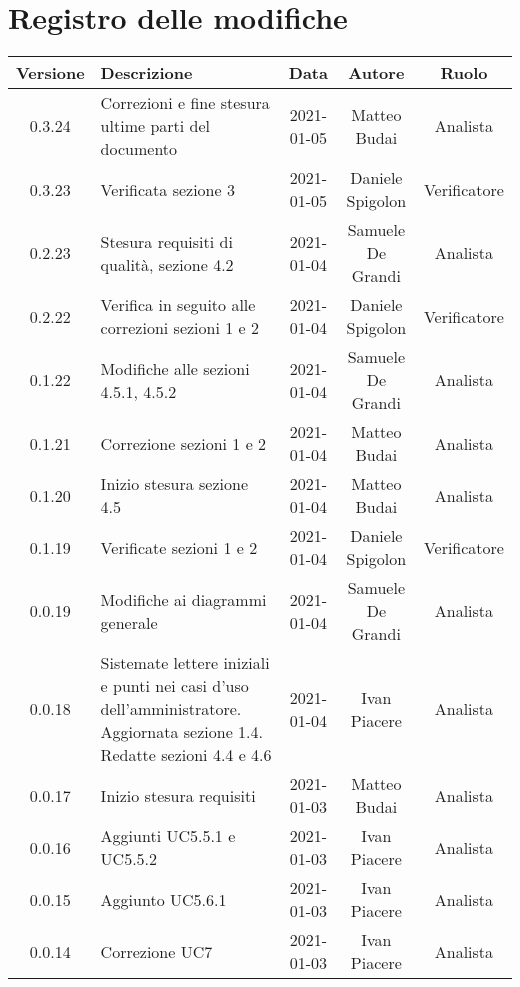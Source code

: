 \section*{Registro delle modifiche}

\begin{center}
	\begin{longtable}{|c|p{5cm}|c|c|c|}
		\hline
		\rowcolor{lighter-grayer}
		\textbf{Versione} & \textbf{Descrizione} & \textbf{Data} & \textbf{Autore} & \textbf{Ruolo} \\
		\hline
		\endfirsthead
		
		0.3.24 & Correzioni e fine stesura ultime parti del documento & 2021-01-05 & Matteo Budai & Analista \\
		\hline
		0.3.23 & Verificata sezione 3 & 2021-01-05 & Daniele Spigolon & Verificatore \\
		\hline
		0.2.23 & Stesura requisiti di qualità, sezione 4.2  & 2021-01-04 & Samuele De Grandi & Analista \\
		\hline
		0.2.22 & Verifica in seguito alle correzioni sezioni 1 e 2   & 2021-01-04 & Daniele Spigolon & Verificatore \\
		\hline
		0.1.22 & Modifiche alle sezioni 4.5.1, 4.5.2   & 2021-01-04 & Samuele De Grandi & Analista \\
		\hline
		0.1.21 & Correzione sezioni 1 e 2 & 2021-01-04 & Matteo Budai & Analista \\
		\hline
		0.1.20 & Inizio stesura sezione 4.5 & 2021-01-04 & Matteo Budai & Analista \\
		\hline
		0.1.19 & Verificate sezioni 1 e 2 & 2021-01-04 & Daniele Spigolon & Verificatore \\
		\hline
		0.0.19 & Modifiche ai diagrammi generale  & 2021-01-04 & Samuele De Grandi & Analista \\
		\hline
		0.0.18 & Sistemate lettere iniziali e punti nei casi d'uso dell'amministratore. Aggiornata sezione 1.4. Redatte sezioni 4.4 e 4.6 & 2021-01-04 & Ivan Piacere & Analista \\
		\hline
		0.0.17 & Inizio stesura requisiti & 2021-01-03 & Matteo Budai & Analista \\
		\hline
		0.0.16 & Aggiunti UC5.5.1 e UC5.5.2 & 2021-01-03 & Ivan Piacere & Analista \\
		\hline
		0.0.15 & Aggiunto UC5.6.1 & 2021-01-03 & Ivan Piacere & Analista \\
		\hline
		0.0.14 & Correzione UC7 & 2021-01-03 & Ivan Piacere & Analista \\

\end{longtable}
\end{center}
